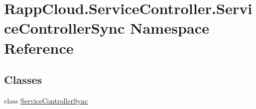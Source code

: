 \hypertarget{namespaceRappCloud_1_1ServiceController_1_1ServiceControllerSync}{\section{Rapp\-Cloud.\-Service\-Controller.\-Service\-Controller\-Sync Namespace Reference}
\label{namespaceRappCloud_1_1ServiceController_1_1ServiceControllerSync}
}
\subsection*{Classes}
\begin{DoxyCompactItemize}
\item 
class \hyperlink{classRappCloud_1_1ServiceController_1_1ServiceControllerSync_1_1ServiceControllerSync}{Service\-Controller\-Sync}
\end{DoxyCompactItemize}

